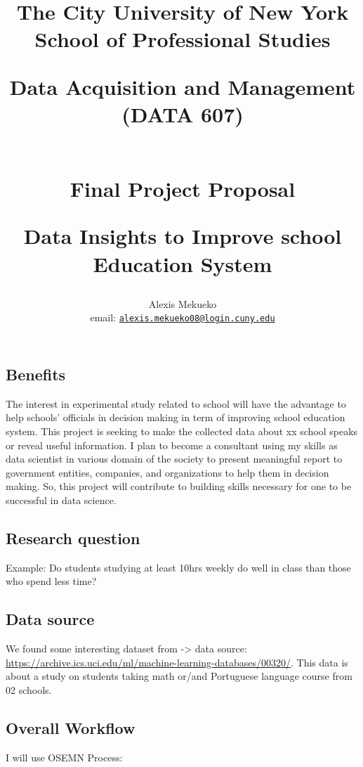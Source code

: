 \documentclass[
]{article}
\title{The City University of New York School of Professional Studies

Data Acquisition and Management (DATA 607)

~\\

Final Project Proposal

Data Insights to Improve school Education System}
\author{Alexis Mekueko

email:
\href{mailto:alexis.mekueko08@login.cuny.edu}{\nolinkurl{alexis.mekueko08@login.cuny.edu}}}
\date{11/13/2020

Github Link: \url{https://github.com/asmozo24/DATA607_Project_Proposal}

Web link: \url{https://rpubs.com/amekueko/690532}}
\begin{document}
\maketitle

\hypertarget{benefits}{%
\subsection{Benefits}\label{benefits}}

The interest in experimental study related to school will have the
advantage to help schools' officials in decision making in term of
improving school education system. This project is seeking to make the
collected data about xx school speaks or reveal useful information. I
plan to become a consultant using my skills as data scientist in various
domain of the society to present meaningful report to government
entities, companies, and organizations to help them in decision making.
So, this project will contribute to building skills necessary for one to
be successful in data science.

\hypertarget{research-question}{%
\subsection{Research question}\label{research-question}}

Example: Do students studying at least 10hrs weekly do well in class
than those who spend less time?

\hypertarget{data-source}{%
\subsection{Data source}\label{data-source}}

We found some interesting dataset from -\textgreater{} data source:
\url{https://archive.ics.uci.edu/ml/machine-learning-databases/00320/}.
This data is about a study on students taking math or/and Portuguese
language course from 02 schools.

\hypertarget{overall-workflow}{%
\subsection{Overall Workflow}\label{overall-workflow}}

I will use OSEMN Process:
\end{document}
